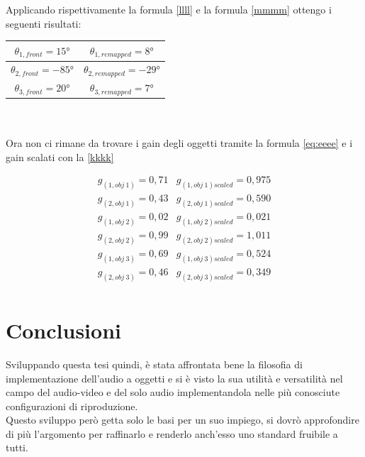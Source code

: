 \documentclass[12pt,a4paper]{report}
\begin{document}
Applicando rispettivamente la formula \ref{llll} e la formula \ref{mmmm} ottengo i seguenti risultati:\\


\begin{tabular}{|c|c|}
\hline
$\theta_{1,front} = 15°$     & $\theta_{1,remapped} =  8°  $   \\
\hline
$\theta_{2,front} = -85°$     & $\theta_{2,remapped} = -29° $     \\
\hline
$\theta_{3,front} = 20°$    & $ \theta_{3,remapped} =  7° $    \\
\hline
\end{tabular} \\
\\

Ora non ci rimane da trovare i gain degli oggetti tramite la formula \ref{eq:eeee} e i gain scalati con la \ref{kkkk}

\begin{equation}
\begin{matrix}
g_{(1,obj\ 1)} = 0,71 & g_{(1,obj\ 1)scaled} = 0,975\\
g_{(2,obj\ 1)} = 0,43 & g_{(2,obj\ 1)scaled} = 0,590\\
g_{(1,obj\ 2)} = 0,02 & g_{(1,obj\ 2)scaled} = 0,021\\
g_{(2,obj\ 2)} = 0,99 & g_{(2,obj\ 2)scaled} = 1,011\\
g_{(1,obj\ 3)} = 0,69 & g_{(1,obj\ 3)scaled} = 0,524\\
g_{(2,obj\ 3)} = 0,46 & g_{(2,obj\ 3)scaled} = 0,349\\
\end{matrix}
\label{gscalatiesempio3}
\end{equation}










\chapter*{Conclusioni}

Sviluppando questa tesi quindi, è stata affrontata bene la filosofia di implementazione dell'audio a oggetti e si è visto la sua utilità e versatilità nel campo del audio-video e del solo audio implementandola nelle più conosciute configurazioni di riproduzione.\\

Questo sviluppo però getta solo le basi per un suo impiego, si dovrò approfondire di più l'argomento per raffinarlo e renderlo anch'esso uno standard fruibile a tutti.\\
\end{document}
